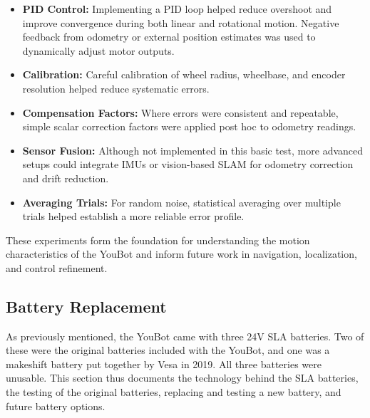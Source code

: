 \documentclass[a4paper, 12pt]{article}
\newif\ifshownotes
\newcommand{\notes}[1]{\ifshownotes\textcolor{blue}{#1}\fi}
\begin{document}
    \begin{itemize}
        \item \textbf{PID Control:} Implementing a PID loop helped reduce overshoot and improve convergence during both linear and rotational motion. Negative feedback from odometry or external position estimates was used to dynamically adjust motor outputs.

        \item \textbf{Calibration:} Careful calibration of wheel radius, wheelbase, and encoder resolution helped reduce systematic errors.

        \item \textbf{Compensation Factors:} Where errors were consistent and repeatable, simple scalar correction factors were applied post hoc to odometry readings.

        \item \textbf{Sensor Fusion:} Although not implemented in this basic test, more advanced setups could integrate IMUs or vision-based SLAM for odometry correction and drift reduction.

        \item \textbf{Averaging Trials:} For random noise, statistical averaging over multiple trials helped establish a more reliable error profile.
    \end{itemize}

    These experiments form the foundation for understanding the motion characteristics of the YouBot and inform future work in navigation, localization, and control refinement.
    \pagebreak



    \subsection{Battery Replacement}



    \notes{draft 1, 11.05 12pm\\
    Here are some good web pages about the Slealed Lead Acid (SLA) batteries:
https://batterymasters.co.uk/blog/post/How%
and
https://www.power-sonic.com/blog/how-to-charge-a-lead-acid-battery/
and
https://www.powerstream.com/SLA.htm}

    As previously mentioned, the YouBot came with three 24V SLA batteries. Two of these were the original batteries included with the YouBot, and one was a makeshift battery put together by Vesa in 2019. All three batteries were unusable. This section thus documents the technology behind the SLA batteries, the testing of the original batteries, replacing and testing a new battery, and future battery options. 
\end{document}
